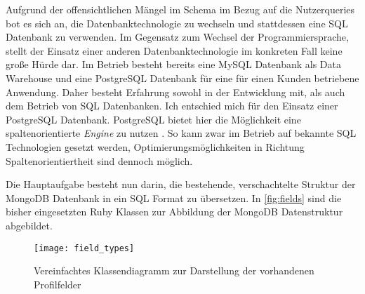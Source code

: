Aufgrund der offensichtlichen Mängel im Schema im Bezug auf die Nutzerqueries bot es sich an, die Datenbanktechnologie zu wechseln und stattdessen eine SQL Datenbank zu verwenden. Im Gegensatz zum Wechsel der Programmiersprache, stellt der Einsatz einer anderen Datenbanktechnologie im konkreten Fall keine große Hürde dar. Im Betrieb besteht bereits eine MySQL \cite{mysql} Datenbank als Data Warehouse und eine PostgreSQL \cite{postgres} Datenbank für eine für einen Kunden betriebene Anwendung. Daher besteht Erfahrung sowohl in der Entwicklung mit, als auch dem Betrieb von SQL Datenbanken.
Ich entschied mich für den Einsatz einer PostgreSQL Datenbank. PostgreSQL bietet hier die Möglichkeit eine spaltenorientierte \textit{Engine} zu nutzen \cite{postgres:column}. So kann zwar im Betrieb auf bekannte SQL Technologien gesetzt werden, Optimierungsmöglichkeiten in Richtung Spaltenorientiertheit sind dennoch möglich.

Die Hauptaufgabe besteht nun darin, die bestehende, verschachtelte Struktur der MongoDB Datenbank in ein SQL Format zu übersetzen.
In \autoref{fig:fields} sind die bisher eingesetzten Ruby Klassen zur Abbildung der MongoDB Datenstruktur abgebildet. 

\begin{figure}[!ht]
    \centering
    \caption{Vereinfachtes Klassendiagramm zur Darstellung der vorhandenen Profilfelder}
    \label{fig:fields}
    \texttt{[image: field\_types]}
\end{figure}

